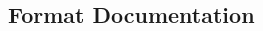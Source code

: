 \documentclass[class=book, crop=false]{standalone}
\begin{document}
\begin{CJK}{UTF8}{gbsn}

\chapter{Format Documentation}



\cleardoublepage

\end{CJK}
\end{document}
